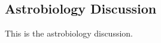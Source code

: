 \subsection{Astrobiology Discussion}
\label{sec:Astrobiology Results Discussion}
This is the astrobiology discussion.
